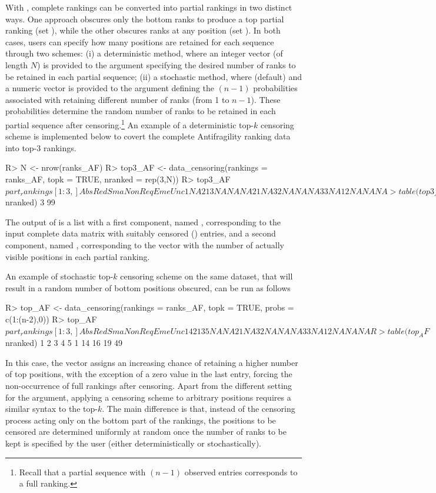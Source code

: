 With , complete rankings can be converted into partial rankings in two distinct ways. One approach obscures only the bottom ranks to produce a top partial ranking (set ), while the other obscures ranks at any position (set ). In both cases, users can specify how many positions are retained for each sequence through two schemes:
(i) a deterministic method, where an integer vector (of length $N$) is provided to the  argument specifying the desired number of ranks to be retained in each partial sequence; (ii) a stochastic method, where  (default) and a numeric vector is provided to the  argument defining the $(n-1)$ probabilities associated with retaining different number of ranks (from 1 to $n-1$). These probabilities determine the random number of ranks to be retained in each partial sequence after censoring.\footnote{Recall that a partial sequence with $(n-1)$ observed entries corresponds to a full ranking.} An example of a deterministic top-$k$ censoring scheme is implemented below to covert the complete Antifragility ranking data into top-3 rankings.

\begin{example}
R> N <- nrow(ranks_AF)
R> top3_AF <- data_censoring(rankings = ranks_AF, topk = TRUE, nranked = rep(3,N))
R> top3_AF$part_rankings[1:3,]
  Abs Red Sma Non Req Eme Unc
1  NA   2   1   3  NA  NA  NA
2   1  NA   3   2  NA  NA  NA
3   3  NA   1   2  NA  NA  NA
> table(top3_AF$nranked)
 3
99
\end{example}
The output of  is a list with a first component, named , corresponding to the input complete data matrix  with suitably censored () entries, and a second component, named , corresponding to the vector with the number of actually visible positions in each partial ranking.

An example of stochastic top-$k$ censoring scheme on the same dataset, that will result in a random number of bottom positions obscured, can be run as follows

\begin{example}
R> top_AF <- data_censoring(rankings = ranks_AF, topk = TRUE, probs = c(1:(n-2),0))
R> top_AF$part_rankings[1:3,]
  Abs Red Sma Non Req Eme Unc
1   4   2   1   3   5  NA  NA
2   1  NA   3   2  NA  NA  NA
3   3  NA   1   2  NA  NA  NA

R> table(top_AF$nranked)
 1  2  3  4  5
 1 14 16 19 49
\end{example}
In this case, the vector  assigns an increasing chance of retaining a higher number of top positions, with the exception of a zero value in the last entry, forcing the non-occurrence of full rankings after censoring. Apart from the different setting for the  argument, applying a censoring scheme to arbitrary positions requires a similar syntax to the top-$k$. The main difference is that, instead of the censoring process acting only on the bottom part of the rankings, the positions to be censored are determined uniformly at random once the number of ranks to be kept is specified by the user (either deterministically or stochastically).

